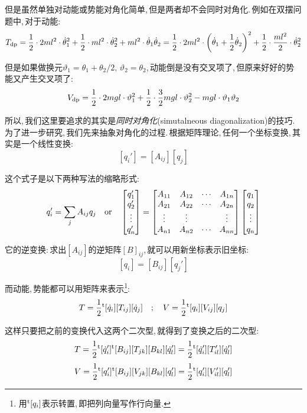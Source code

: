 但是虽然单独对动能或势能对角化简单,\,但是两者却不会同时对角化.\,例如在双摆问题中,\,对于动能:
\[T_{\rm dp}=\frac{1}{2}\cdot 2ml^2\cdot\dot{\theta}_1^2+\frac{1}{2}\cdot ml^2\cdot\dot{\theta}_2^2+ml^2\cdot\dot{\theta}_1\dot{\theta}_2=\frac{1}{2}\cdot 2ml^2\cdot\left(\dot{\theta}_1+\frac{1}{2}\dot{\theta}_2\right)^2+\frac{1}{2}\cdot \frac{ml^2}{2}\cdot\dot{\theta}_2^2\]

但是如果做换元$\vartheta_1=\theta_1+\theta_2/2,\,\vartheta_2=\theta_2$,\,动能倒是没有交叉项了,\,但原来好好的势能又产生交叉项了:
\[V_{\rm dp}=\frac{1}{2}\cdot 2mgl\cdot{\vartheta}_1^2+\frac{1}{2}\cdot \frac{3}{2}mgl\cdot{\vartheta}_2^2-mgl\cdot {\vartheta}_1{\vartheta}_2\]

所以,\,我们这里要追求的其实是\emph{同时对角化}(simutalneous diagonalization)的技巧.\,为了进一步研究,\,我们先来抽象对角化的过程.\,根据矩阵理论,\,任何一个坐标变换,\,其实是一个线性变换:
\[[q_i']=[A_{ij}][q_j]\]

这个式子是以下两种写法的缩略形式:
\[q_i'=\sum_j A_{ij}q_j\quad {\rm or}\quad \begin{bmatrix}q_1'\\q_2'\\ \vdots\\ q_n'\end{bmatrix}=\begin{bmatrix}A_{11}&A_{12}&\cdots&A_{1n}\\ A_{21}&A_{22}&\cdots &A_{2n}\\ \vdots&\vdots &&\vdots\\ A_{n1}&A_{n2}&\cdots &A_{nn} \end{bmatrix}\begin{bmatrix}q_1\\q_2\\ \vdots\\ q_n\end{bmatrix}\]

它的逆变换:\,求出$[A_{ij}]$的逆矩阵$[B]_{ij}$,\,就可以用新坐标表示旧坐标:
\[[q_i]=[B_{ij}][q_j']\]

而动能,\,势能都可以用矩阵来表示\footnote{用$\phantom{}^{\rm t}[q_i]$表示转置,\,即把列向量写作行向量.}:
\[T=\frac{1}{2}\phantom{}^{\rm t}[\dot{q}_i][T_{ij}][\dot{q}_j]\quad ;\quad V=\frac{1}{2}\phantom{}^{\rm t}[q_i][V_{ij}][q_j]\]

这样只要把之前的变换代入这两个二次型,\,就得到了变换之后的二次型:
\[T=\frac{1}{2}\phantom{}^{\rm t}[\dot{q}'_i]\phantom{}^{\rm t}[B_{ij}][T_{jk}][B_{kl}][\dot{q}'_l]=\frac{1}{2}\phantom{}^{\rm t}[\dot{q}'_i][T'_{il}][\dot{q}'_l]\]
\[V=\frac{1}{2}\phantom{}^{\rm t}[q'_i]\phantom{}^{\rm t}[B_{ij}][V_{jk}][B_{kl}][q'_l]=\frac{1}{2}\phantom{}^{\rm t}[q'_i][V'_{il}][q'_l]\]

